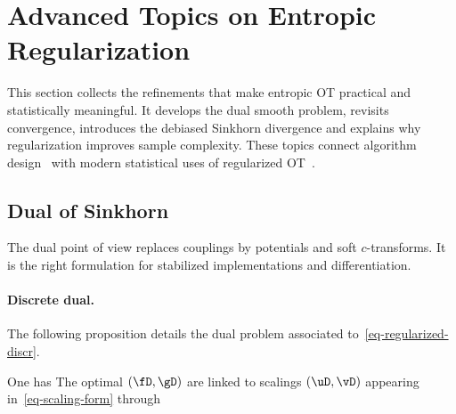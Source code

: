 
\section{Advanced Topics on Entropic Regularization}
\label{sec-sinkhorn-advanced}

This section collects the refinements that make entropic OT practical and statistically meaningful. It develops the dual smooth problem, revisits convergence, introduces the debiased Sinkhorn divergence and explains why regularization improves sample complexity. These topics connect algorithm design~\cite{cuturi2018semidual,2017-carlier-SIMA} with modern statistical uses of regularized OT~\cite{genevay2018sample,feydy2018interpolating}.

\subsection{Dual of Sinkhorn}

The dual point of view replaces couplings by potentials and soft $c$-transforms. It is the right formulation for stabilized implementations and differentiation.

\paragraph{Discrete dual.}

The following proposition details the dual problem associated to~\eqref{eq-regularized-discr}.

\begin{prop}
One has
%
The optimal $(\fD,\gD)$ are linked to scalings $(\uD,\vD)$ appearing in~\eqref{eq-scaling-form} through
\end{prop}

